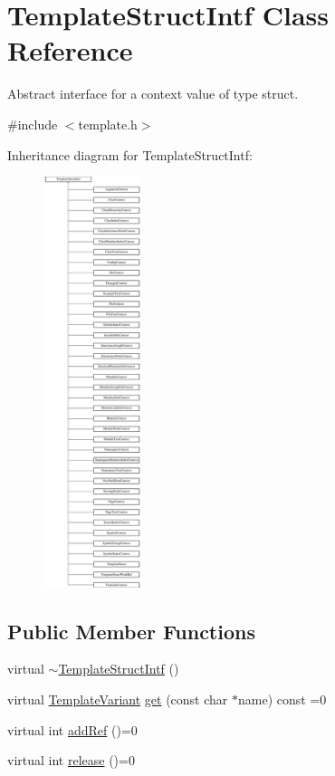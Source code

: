 \hypertarget{class_template_struct_intf}{}\section{Template\+Struct\+Intf Class Reference}
\label{class_template_struct_intf}


Abstract interface for a context value of type struct.  




{\ttfamily \#include $<$template.\+h$>$}

Inheritance diagram for Template\+Struct\+Intf\+:\begin{figure}[H]
\begin{center}
\leavevmode
\includegraphics[height=12.000000cm]{class_template_struct_intf}
\end{center}
\end{figure}
\subsection*{Public Member Functions}
\begin{DoxyCompactItemize}
\item 
virtual \mbox{\hyperlink{class_template_struct_intf_a54ce5b2065da3e862da316db259cb49d}{$\sim$\+Template\+Struct\+Intf}} ()
\item 
virtual \mbox{\hyperlink{class_template_variant}{Template\+Variant}} \mbox{\hyperlink{class_template_struct_intf_a3d610cb81b4adbb531ebed3aa3d09b51}{get}} (const char $\ast$name) const =0
\item 
virtual int \mbox{\hyperlink{class_template_struct_intf_a05fe97ad47633beb326f69686faed581}{add\+Ref}} ()=0
\item 
virtual int \mbox{\hyperlink{class_template_struct_intf_a3dce7dd29d3f66a8080b40578e8a5045}{release}} ()=0
\end{DoxyCompactItemize}


